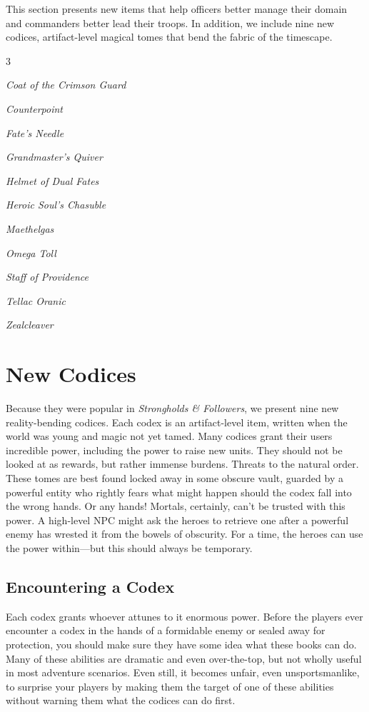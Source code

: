 \documentclass[10pt,a4paper,twoside,bg=print,twocolumn,openany,nodeprecatedcode]{dndbook}
\begin{document}
This section presents new items that help officers better manage their domain and commanders better lead their troops. In addition, we include nine new codices, artifact-level magical tomes that bend the fabric of the timescape.


\begin{itemize}
\begin{multicols}{3}
\item \textit{Coat of the Crimson Guard}
\item \textit{Counterpoint}
\item \textit{Fate's Needle}
\item \textit{Grandmaster's Quiver}
\item \textit{Helmet of Dual Fates}
\item \textit{Heroic Soul's Chasuble}
\item \textit{Maethelgas}
\item \textit{Omega Toll}
\item \textit{Staff of Providence}
\item \textit{Tellac Oranic}
\item \textit{Zealcleaver}
\end{multicols}

\end{itemize}

\section{New Codices}
Because they were popular in \textit{Strongholds \& Followers}, we present nine new reality-bending codices. Each codex is an artifact-level item, written when the world was young and magic not yet tamed. Many codices grant their users incredible power, including the power to raise new units. They should not be looked at as rewards, but rather immense burdens. Threats to the natural order. These tomes are best found locked away in some obscure vault, guarded by a powerful entity who rightly fears what might happen should the codex fall into the wrong hands. Or any hands! Mortals, certainly, can't be trusted with this power. A high-level NPC might ask the heroes to retrieve one after a powerful enemy has wrested it from the bowels of obscurity. For a time, the heroes can use the power within—but this should always be temporary.

\subsection{Encountering a Codex}
Each codex grants whoever attunes to it enormous power. Before the players ever encounter a codex in the hands of a formidable enemy or sealed away for protection, you should make sure they have some idea what these books can do. Many of these abilities are dramatic and even over-the-top, but not wholly useful in most adventure scenarios. Even still, it becomes unfair, even unsportsmanlike, to surprise your players by making them the target of one of these abilities without warning them what the codices can do first.
\end{document}
